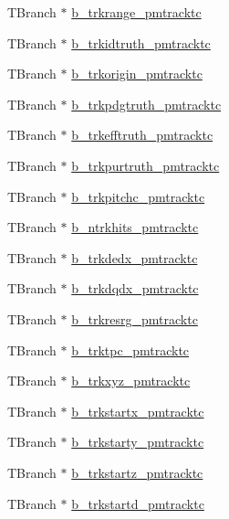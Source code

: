 \begin{DoxyCompactItemize}
T\-Branch $\ast$ \hyperlink{classanatree_a609f2fc9fbce7c97821e45c8f63d7cba}{b\-\_\-trkrange\-\_\-pmtracktc}
\item 
T\-Branch $\ast$ \hyperlink{classanatree_ad525724bfceba035cd26eb4deef49e04}{b\-\_\-trkidtruth\-\_\-pmtracktc}
\item 
T\-Branch $\ast$ \hyperlink{classanatree_a0ad0f7bddd5f1b4397dda164e4042cc2}{b\-\_\-trkorigin\-\_\-pmtracktc}
\item 
T\-Branch $\ast$ \hyperlink{classanatree_a482a9f08a15526c82c270fac97fb9623}{b\-\_\-trkpdgtruth\-\_\-pmtracktc}
\item 
T\-Branch $\ast$ \hyperlink{classanatree_a99f25dcf1c3d8664b11be0fd24ad3f5c}{b\-\_\-trkefftruth\-\_\-pmtracktc}
\item 
T\-Branch $\ast$ \hyperlink{classanatree_a932c2b2b4bb0861154fadb276ccc8564}{b\-\_\-trkpurtruth\-\_\-pmtracktc}
\item 
T\-Branch $\ast$ \hyperlink{classanatree_aaaef94e829eba30dd51c239035fd9efc}{b\-\_\-trkpitchc\-\_\-pmtracktc}
\item 
T\-Branch $\ast$ \hyperlink{classanatree_afab02fa6ac051ed290ba42ed48cf58f9}{b\-\_\-ntrkhits\-\_\-pmtracktc}
\item 
T\-Branch $\ast$ \hyperlink{classanatree_aa2a79f881e8f1501bc9b2389ce41efa0}{b\-\_\-trkdedx\-\_\-pmtracktc}
\item 
T\-Branch $\ast$ \hyperlink{classanatree_ac1169b3205896dc2e528589a89d883bc}{b\-\_\-trkdqdx\-\_\-pmtracktc}
\item 
T\-Branch $\ast$ \hyperlink{classanatree_a8f08ab65e45278c6d6da51bddbf79945}{b\-\_\-trkresrg\-\_\-pmtracktc}
\item 
T\-Branch $\ast$ \hyperlink{classanatree_a14d4038e695c9957078bf503aa27acab}{b\-\_\-trktpc\-\_\-pmtracktc}
\item 
T\-Branch $\ast$ \hyperlink{classanatree_a35e8d0eef681c1dbf65875395f9a4162}{b\-\_\-trkxyz\-\_\-pmtracktc}
\item 
T\-Branch $\ast$ \hyperlink{classanatree_af647774649d318437fdccc981e7d2dd3}{b\-\_\-trkstartx\-\_\-pmtracktc}
\item 
T\-Branch $\ast$ \hyperlink{classanatree_a35c8b329adbccda266a8fd37ade4a55a}{b\-\_\-trkstarty\-\_\-pmtracktc}
\item 
T\-Branch $\ast$ \hyperlink{classanatree_ad5e89ba1e9045423acf8d9685f114b03}{b\-\_\-trkstartz\-\_\-pmtracktc}
\item 
T\-Branch $\ast$ \hyperlink{classanatree_a406072c6934ffb369b2e445b3adba840}{b\-\_\-trkstartd\-\_\-pmtracktc}
\item 

\end{DoxyCompactItemize}
